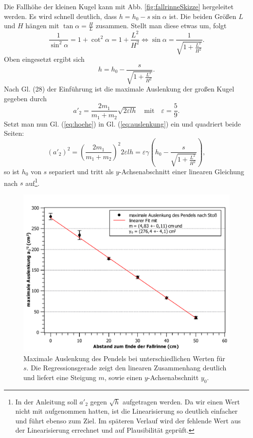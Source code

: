 	Die Fallhöhe der kleinen Kugel kann mit Abb. \ref{fig:fallrinneSkizze} hergeleitet werden.
	Es wird schnell deutlich, dass $h = h_0 - s \sin \alpha$ ist.
	Die beiden Größen $L$ und $H$ hängen mit $\tan \alpha = \frac{H}{L}$ zusammen.
	Stellt man diese etwas um, folgt
	\begin{equation}
		\frac{1}{\sin^2 \alpha} = 1 + \cot^2 \alpha = 1 + \frac{L^2}{H^2} \Leftrightarrow \sin \alpha = \frac{1}{\sqrt{1 + 	\frac{L^2}{H^2}}}.
	\end{equation}
	Oben eingesetzt ergibt sich 
	\begin{equation}
		\label{eq:hoehe}
		h = h_0 - \frac{s}{\sqrt{1 + \frac{L^2}{H^2}}}.
	\end{equation}
	Nach Gl. (28) der Einführung ist die maximale Auslenkung der großen Kugel gegeben durch
	\begin{equation}
		\label{eq:auslenkung}
		a'_2 = \frac{2 m_1}{m_1 + m_2} \sqrt{2 \varepsilon l h} \quad \text{mit} \quad \varepsilon = \frac{5}{9}.
	\end{equation}
	Setzt man nun Gl. (\ref{eq:hoehe}) in Gl. (\ref{eq:auslenkung}) ein und quadriert beide Seiten:
	\begin{equation}
		\label{eq:auslenkung2}
		(a'_2)^2 = \left( \frac{2 m_1}{m_1 + m_2}\right) ^2 2 \varepsilon l h = \varepsilon\gamma \left( h_0 - \frac{s}{\sqrt{1 + \frac{L^2}{H^2}}}\right),
	\end{equation}
	so ist $h_0$ von $s$ separiert und tritt als $y$-Achsenabschnitt einer linearen Gleichung nach $s$ auf\footnote{In der Anleitung soll $a'_2$ gegen $\sqrt{h}$ aufgetragen werden. Da wir einen Wert nicht mit aufgenommen hatten, ist die Linearisierung so deutlich einfacher und führt ebenso zum Ziel. Im späteren Verlauf wird der fehlende Wert aus der Linearisierung errechnet und auf Plausibilität geprüft.}.
	
	\begin{figure}[ht]
		\centering
		\includegraphics[width=\textwidth]{AuslenkungProAbstand.pdf}
		\caption{Maximale Auslenkung des Pendels bei unterschiedlichen Werten für $s$. Die Regressionsgerade zeigt den linearen Zusammenhang deutlich und liefert eine Steigung $m$, sowie einen $y$-Achsenabschnitt $y_0$.}
		\label{fig:fallrinneAuslenkung}	
	\end{figure}

